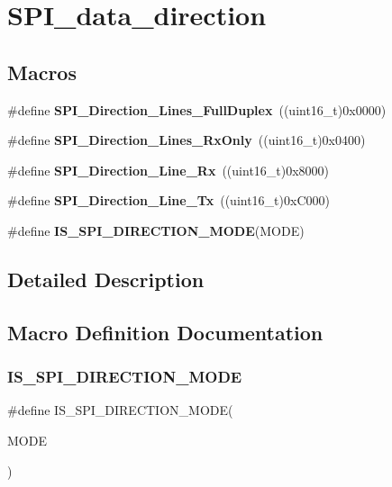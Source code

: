 \section{S\+P\+I\+\_\+data\+\_\+direction}
\label{group__SPI__data__direction}
\subsection*{Macros}
\begin{DoxyCompactItemize}
\item 
\#define \textbf{ S\+P\+I\+\_\+\+Direction\+\_\+Lines\+\_\+\+Full\+Duplex}~((uint16\+\_\+t)0x0000)
\item 
\#define \textbf{ S\+P\+I\+\_\+\+Direction\+\_\+Lines\+\_\+\+Rx\+Only}~((uint16\+\_\+t)0x0400)
\item 
\#define \textbf{ S\+P\+I\+\_\+\+Direction\+\_\+Line\+\_\+\+Rx}~((uint16\+\_\+t)0x8000)
\item 
\#define \textbf{ S\+P\+I\+\_\+\+Direction\+\_\+Line\+\_\+\+Tx}~((uint16\+\_\+t)0x\+C000)
\item 
\#define \textbf{ I\+S\+\_\+\+S\+P\+I\+\_\+\+D\+I\+R\+E\+C\+T\+I\+O\+N\+\_\+\+M\+O\+DE}(M\+O\+DE)
\end{DoxyCompactItemize}


\subsection{Detailed Description}


\subsection{Macro Definition Documentation}
\mbox{\label{group__SPI__data__direction_ga536857c68ce1d9806c04046707448b3e}} 
\subsubsection{I\+S\+\_\+\+S\+P\+I\+\_\+\+D\+I\+R\+E\+C\+T\+I\+O\+N\+\_\+\+M\+O\+DE}
{\footnotesize\ttfamily \#define I\+S\+\_\+\+S\+P\+I\+\_\+\+D\+I\+R\+E\+C\+T\+I\+O\+N\+\_\+\+M\+O\+DE(\begin{DoxyParamCaption}\item[{}]{M\+O\+DE }\end{DoxyParamCaption})}

